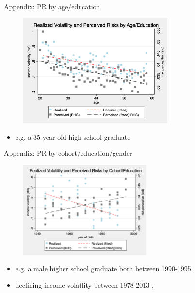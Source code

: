 \documentclass{beamer}
\begin{document}
\begin{frame}{Appendix: PR by age/education}
	\begin{figure}[ht]
		\label{appendix:age_educ_compare_figure}
		\centering
		\includegraphics[width=0.7\textwidth]{figures/real_log_wage_shk_gr_by_age_edu_compare.png}
	\end{figure}
	\begin{itemize}
		\item e.g. a 35-year old high school graduate \quad  \hyperlink{age_compare}{} 
	\end{itemize}
\end{frame}



\begin{frame}{Appendix: PR by cohort/education/gender}
	\label{cohort_compare}
	\begin{figure}[ht]
		\label{appendix: compare_by_cohort}
		\centering
		\includegraphics[width=0.6\textwidth]{figures/real_log_wage_shk_gr_by_byear_5yr_edu_gender_compare.png}
	\end{figure}
	\begin{itemize}
		\item e.g. a male higher school graduate born between 1990-1995 \quad \hyperlink{appendix:cohort_compare_figure}{}   
		\quad \hyperlink{appendix1:cohort_edu_compare_figure}{}   
		\quad \hyperlink{appendix2:cohort_edu_compare_figure}{}     \quad  \hyperlink{age_compare}{} 
		\item declining income volatlity between 1978-2013 \cite{sabelhaus2010great}, \cite{bloom2018great} 
	\end{itemize}
\end{frame}
\end{document}
